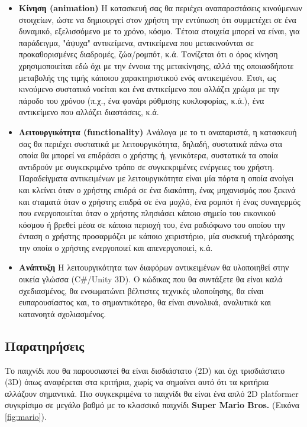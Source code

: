 \documentclass[12pt]{article}
\begin{document}
\begin{itemize}
		\item \textbf{Κίνηση (animation)} Η κατασκευή σας θα περιέχει αναπαραστάσεις κινούμενων στοιχείων, ώστε να δημιουργεί στον χρήστη την εντύπωση ότι συμμετέχει σε ένα δυναμικό, εξελισσόμενο με το χρόνο, κόσμο. Τέτοια στοιχεία μπορεί να είναι, για παράδειγμα, "άψυχα" αντικείμενα, αντικείμενα που μετακινούνται σε προκαθορισμένες διαδρομές, ζώα/ρομπότ, κ.ά. Τονίζεται ότι ο όρος κίνηση χρησιμοποιείται εδώ όχι με την έννοια της μετακίνησης, αλλά της οποιασδήποτε μεταβολής της τιμής κάποιου χαρακτηριστικού ενός αντικειμένου. Έτσι, ως κινούμενο συστατικό νοείται και ένα αντικείμενο που αλλάζει χρώμα με την πάροδο του χρόνου (π.χ., ένα φανάρι ρύθμισης κυκλοφορίας, κ.ά.), ένα αντικείμενο που αλλάζει διαστάσεις, κ.ά.

		\item \textbf{Λειτουργικότητα (functionality)} Ανάλογα με το τι αναπαριστά, η κατασκευή σας θα περιέχει συστατικά με λειτουργικότητα, δηλαδή, συστατικά πάνω στα οποία θα μπορεί να επιδράσει ο χρήστης ή, γενικότερα, συστατικά τα οποία αντιδρούν με συγκεκριμένο τρόπο σε συγκεκριμένες ενέργειες του χρήστη. Παραδείγματα αντικειμένων με λειτουργικότητα είναι μία πόρτα η οποία
		ανοίγει και κλείνει όταν ο χρήστης επιδρά σε ένα διακόπτη, ένας μηχανισμός που ξεκινά και σταματά όταν ο χρήστης επιδρά σε ένα μοχλό, ένα ρομπότ ή ένας συναγερμός που ενεργοποιείται όταν ο χρήστης πλησιάσει κάποιο σημείο του εικονικού κόσμου ή βρεθεί μέσα
		σε κάποια περιοχή του, ένα ραδιόφωνο του οποίου την ένταση ο χρήστης προσαρμόζει με κάποιο χειριστήριο, μία συσκευή τηλεόρασης την οποία ο χρήστης ενεργοποιεί και απενεργοποιεί, κ.ά.
		
		\item \textbf{Ανάπτυξη} Η λειτουργικότητα των διαφόρων αντικειμένων θα υλοποιηθεί στην οικεία γλώσσα (C\#/Unity 3D). Ο κώδικας που θα συντάξετε θα είναι καλά σχεδιασμένος, θα ενσωματώνει βέλτιστες τεχνικές υλοποίησης, θα είναι ευπαρουσίαστος και, το σημαντικότερο, θα είναι συνολικά, αναλυτικά και κατανοητά σχολιασμένος.
		
		
	\end{itemize}

	\subsection{Παρατηρήσεις}
	Το παιχνίδι που θα παρουσιαστεί θα είναι δισδιάστατο (2D) και όχι τρισδιάστατο (3D) όπως αναφέρεται στα κριτήρια, χωρίς να σημαίνει αυτό ότι τα κριτήρια αλλάζουν σημαντικά. Πιο συγκεκριμένα το παιχνίδι θα είναι ένα απλό 2D platformer συγκρίσιμο σε μεγάλο βαθμό με το κλασσικό παιχνίδι \textbf{Super Mario Bros.} (Εικόνα \ref{fig:mario}).
	
\end{document}
